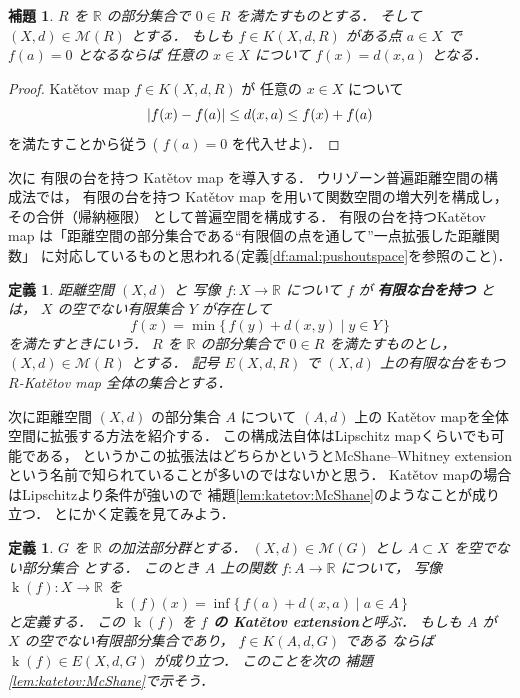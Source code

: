 \documentclass[leqno, 12pt]{jsarticle}
\newtheorem{lem}[thm]{補題}
\newtheorem{df}[thm]{定義}
\newcommand{\rr}{\mathbb{R}}
\DeclareMathOperator{\kat}{k}
\newcommand{\KatExt}[1]{\kat(#1)}
\DeclarePairedDelimiter{\abs}{\lvert}{\rvert}
\newcommand{\Met}[1]{\mathscr{M}(#1)}
\newcommand{\KatSpace}[3]{K(#1,#2,#3)}
\newcommand{\Espace}[3]{E(#1,#2,#3)}
\begin{document}
\begin{lem}\label{lem:katetov:onept}
$R$
を
$\rr$
の部分集合で
$0\in R$
を満たすものとする．
そして
$(X,d)\in \Met{R}$
とする．
もしも
$f\in \KatSpace{X}{d}{R}$
がある点
$a\in X$
で
$f(a)=0$
となるならば
任意の
$x\in X$
について
$f(x)=d(x, a)$
となる．
\end{lem}
\begin{proof}
Kat\v{e}tov map
$f\in \KatSpace{X}{d}{R}$
が
任意の
$x \in X$%
について
\[
\abs{f(x)-f(a)}\le d(x, a)\le f(x)+f(a)
\]
を満たすことから従う
(%
$f(a)=0$%
を代入せよ)．
\end{proof}


次に
有限の台を持つ
Kat\v{e}tov
map
を導入する．
ウリゾーン普遍距離空間の構成法では，
有限の台を持つ
Kat\v{e}tov
map
を用いて関数空間の増大列を構成し，その合併（帰納極限）
として普遍空間を構成する．
有限の台を持つKat\v{e}tov
map
は「距離空間の部分集合である``有限個の点を通して''一点拡張した距離関数」
に対応しているものと思われる(定義\ref{df:amal:pushoutspace}を参照のこと)．
\begin{df}\label{df:katetov:finitesupport}
距離空間
$(X, d)$%
と
写像
$f\colon X\to \rr$
について
$f$
が
\textbf{有限な台を持つ}
とは，
$X$
の空でない有限集合
$Y$
が存在して
\[
f(x)=\min \{\, f(y)+d(x, y)\mid y\in Y\, \}
\]
を満たすときにいう．
$R$
を
$\rr$
の部分集合で
$0\in R$
を満たすものとし，
$(X, d)\in \Met{R}$
とする．
記号
$\Espace{X}{d}{R}$
で
$(X, d)$
上の有限な台をもつ
$R$-Kat\v{e}tov map
全体の集合とする．
\end{df}


次に距離空間
$(X, d)$
の部分集合
$A$
について
$(A, d)$
上の
Kat\v{e}tov mapを全体空間に拡張する方法を紹介する．
この構成法自体はLipschitz mapくらいでも可能である，
というかこの拡張法はどちらかというとMcShane--Whitney extension という名前で知られていることが多いのではないかと思う．
Kat\v{e}tov mapの場合はLipschitzより条件が強いので
補題\ref{lem:katetov:McShane}のようなことが成り立つ．
とにかく定義を見てみよう．

\begin{df}\label{df:katetov:katext}
$G$
を
$\rr$
の加法部分群とする．
$(X, d)\in \Met{G}$
とし
$A\subset X$
を空でない部分集合
とする．
このとき
$A$
上の関数
$f\colon A\to \rr$%
について，
写像
$\KatExt{f}\colon X\to \rr$%
を
\[
\KatExt{f}(x)=\inf \{\, f(a)+d(x,a)\mid a\in A\, \}
\]
と定義する．
この
$\KatExt{f}$
を
\textbf{%
$f$%
の
Kat\v{e}tov extension}と呼ぶ．
もしも
$A$
が
$X$
の空でない有限部分集合であり，
$f\in \KatSpace{A}{d}{G}$%
である
ならば
$\KatExt{f}\in \Espace{X}{d}{G}$
が成り立つ．
このことを次の
補題
\ref{lem:katetov:McShane}で示そう．
\end{df}
\end{document}
